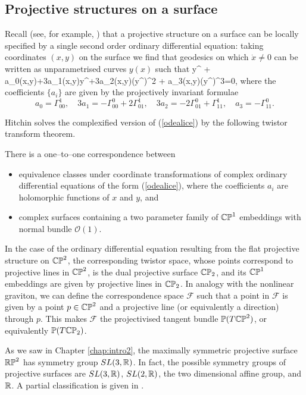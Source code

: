 
\subsection{Projective structures on a surface}
Recall (see, for example, \cite{BDE}) that a projective structure on a surface can be locally specified by a single second order ordinary differential equation: taking coordinates $(x,y)$ on the surface we find that geodesics on which $\dot{x}\neq 0$ can be written as unparametrised curves $y(x)$ such that
\be
\label{odealice}
y^{\prime \prime} + a_0(x,y)+3a_1(x,y)y^{\prime}+3a_2(x,y)(y^{\prime})^2 + a_3(x,y)(y^\prime)^3=0,
\ee
where the coefficients $\{a_i\}$ are given by the projectively invariant formulae
\[
a_0=\Gamma^1_{00},\quad
3a_1=-\Gamma^0_{00}+2\Gamma^1_{01},\quad
3a_2=-2\Gamma^0_{01}+\Gamma^1_{11},\quad
a_3=-\Gamma^0_{11}.
\]

Hitchin \cite{hitchin} solves the complexified version of (\ref{odealice}) by the following twistor transform theorem.
\begin{theo}
There is a one--to--one correspondence between
\begin{itemize}
\item equivalence classes under coordinate transformations of complex ordinary differential equations of the form (\ref{odealice}), where the coefficients $a_i$ are holomorphic functions of $x$ and $y$, and
\item complex surfaces containing a two parameter family of $\mathbb{CP}^1$ embeddings with normal bundle $\mathcal{O}(1)$.
\end{itemize}
\end{theo}
\noindent In the case of the ordinary differential equation resulting from the flat projective structure on $\mathbb{CP}^2$, the corresponding twistor space, whose points correspond to projective lines in $\mathbb{CP}^2$, is the dual projective surface $\mathbb{CP}_2$, and its $\mathbb{CP}^1$ embeddings are given by projective lines in $\mathbb{CP}_2$. In analogy with the nonlinear graviton, we can define the correspondence space $\mathcal{F}$ such that a point in $\mathcal{F}$ is given by a point $p\in\mathbb{CP}^2$ and a projective line (or equivalently a direction) through $p$. This makes $\mathcal{F}$ the projectivised tangent bundle $\mathbb{P}(T\mathbb{CP}^2)$, or equivalently $\mathbb{P}(T\mathbb{CP}_2)$.

As we saw in Chapter \ref{chap:intro2}, the maximally symmetric projective surface $\mathbb{RP}^2$ has symmetry group $SL(3,\mathbb{R})$. In fact, the possible symmetry groups of projective surfaces are $SL(3, \mathbb{R})$, $SL(2,\mathbb{R})$, the two dimensional affine group, and $\mathbb{R}$. A partial classification is given in \cite{Bryant}.

